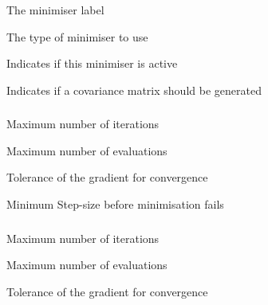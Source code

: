 
 {The minimiser label}

 {The type of minimiser to use}

 {Indicates if this minimiser is active}

 {Indicates if a covariance matrix should be generated}

\subsubsection[A D O L C]{}

 {Maximum number of iterations}

 {Maximum number of evaluations}

 {Tolerance of the gradient for convergence}

 {Minimum Step-size before minimisation fails}

\subsubsection[Beta Diff]{}

 {Maximum number of iterations}

 {Maximum number of evaluations}

 {Tolerance of the gradient for convergence}

\subsubsection[C P P A D]{}

\subsubsection[D E Solver]{}

